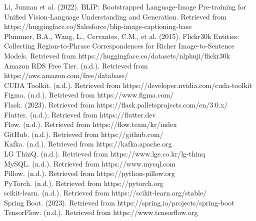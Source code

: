 \documentclass[conference]{IEEEtran}
\begin{document}
\begin{thebibliography}{00}
 Li, Junnan et al. (2022). BLIP: Bootstrapped Language-Image Pre-training for Unified Vision-Language Understanding and Generation. Retrieved from https://huggingface.co/Salesforce/blip-image-captioning-base\\
 Plummer, B.A., Wang, L., Cervantes, C.M., et al. (2015). Flickr30k Entities: Collecting Region-to-Phrase Correspondences for Richer Image-to-Sentence Models. Retrieved from https://huggingface.co/datasets/nlphuji/flickr30k\\
 Amazon RDS Free Tier. (n.d.). Retrieved from https://aws.amazon.com/free/database/\\
 CUDA Toolkit. (n.d.). Retrieved from https://developer.nvidia.com/cuda-toolkit\\
 Figma. (n.d.). Retrieved from https://www.figma.com/\\
 Flask. (2023). Retrieved from https://flask.palletsprojects.com/en/3.0.x/\\
 Flutter. (n.d.). Retrieved from https://flutter.dev\\
 Flow. (n.d.). Retrieved from https://flow.team/kr/index\\
 GitHub. (n.d.). Retrieved from https://github.com/\\
 Kafka. (n.d.). Retrieved from https://kafka.apache.org\\
LG ThinQ. (n.d.). Retrieved from https://www.lge.co.kr/lg-thinq\\
MySQL. (n.d.). Retrieved from https://www.mysql.com\\
 Pillow. (n.d.). Retrieved from https://python-pillow.org\\
 PyTorch. (n.d.). Retrieved from https://pytorch.org\\
 scikit-learn. (n.d.). Retrieved from https://scikit-learn.org/stable/\\
 Spring Boot. (2023). Retrieved from https://spring.io/projects/spring-boot\\
 TensorFlow. (n.d.). Retrieved from https://www.tensorflow.org
\end{thebibliography}
\end{document}
